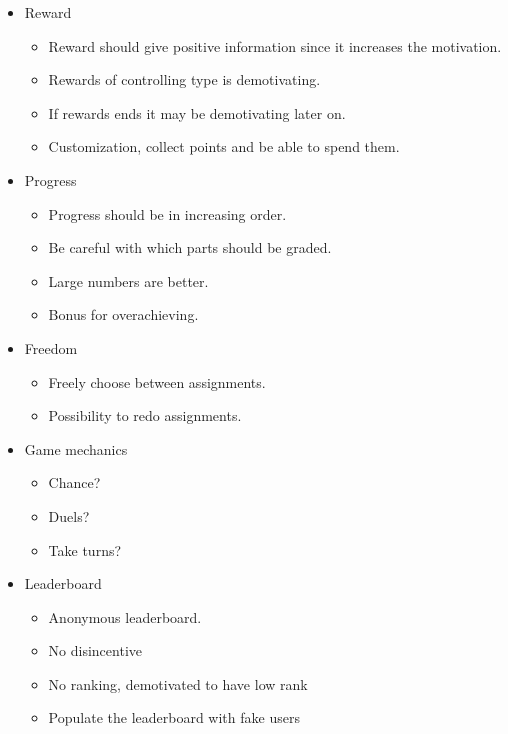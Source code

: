 \begin{itemize}
\item Reward
\begin{itemize}
 \item Reward should give positive information since it increases the motivation.
 \item Rewards of controlling type is demotivating.
 \item If rewards ends it may be demotivating later on.
 \item Customization, collect points and be able to spend them.
 \end{itemize}
\item Progress
\begin{itemize}
    \item Progress should be in increasing order.
    \item Be careful with which parts should be graded.
    \item Large numbers are better.
    \item Bonus for overachieving. 
\end{itemize}
\item Freedom
\begin{itemize}
    \item Freely choose between assignments.
    \item Possibility to redo assignments.
\end{itemize}
\item Game mechanics
\begin{itemize}
    \item Chance?
    \item Duels?
    \item Take turns?
\end{itemize}
\item Leaderboard
\begin{itemize}
    \item Anonymous leaderboard.
    \item No disincentive
    \item No ranking, demotivated to have low rank
    \item Populate the leaderboard with fake users
\end{itemize}
\end{itemize}

